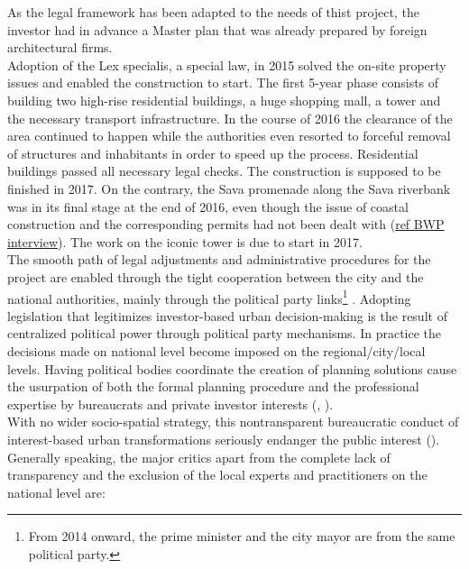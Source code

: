 \documentclass[11pt]{report}
\begin{document}
\begin{itemize}
As the legal framework has been adapted to the needs of thist project, the investor had in advance a Master plan that was already prepared by foreign architectural firms.
\\
Adoption of the Lex specialis, a special law, in 2015 solved the on-site property issues and enabled the construction to start.
The first 5-year phase consists of building two high-rise residential buildings, a huge shopping mall, a tower and the necessary transport infrastructure. 
In the course of 2016 the clearance of the area continued to happen while the authorities even resorted to forceful removal of structures and inhabitants in order to speed up the process.
Residential buildings passed all necessary legal checks. The construction is supposed to be finished in 2017.
On the contrary, the Sava promenade along the Sava riverbank was in its final stage at the end of 2016, even though the issue of coastal construction and the corresponding permits had not been dealt with (\href{ref}{ref BWP interview}).
The work on the iconic tower is due to start in 2017.
\\
The smooth path of legal adjustments and administrative procedures for the project are enabled through the tight cooperation between the city and the national authorities, mainly through the political party links\footnote{From 2014 onward, the prime minister and the city mayor are from the same political party.}
\cite{Maruna 2015, Peric 2016}.
Adopting legislation that legitimizes investor-based urban decision-making is the result of centralized political power through political party mechanisms.
In practice the decisions made on national level become imposed on the regional/city/local levels.
Having political bodies coordinate the creation of planning solutions cause the usurpation of both the formal planning procedure and the professional expertise by bureaucrats and private investor interests (\href{ref}{\cite{Maruna 2015}}, \href{ref}{\citealt{peric_evolution_2016}}).
\\
With no wider socio-spatial strategy, this nontransparent bureaucratic conduct of interest-based urban transformations seriously endanger the public interest (\cite{Vukmirovic in Doytchinov et al 2015}). 
Generally speaking, the major critics apart from the complete lack of transparency and the exclusion of the local experts and practitioners on the national level are:


\end{itemize}
\end{document}
